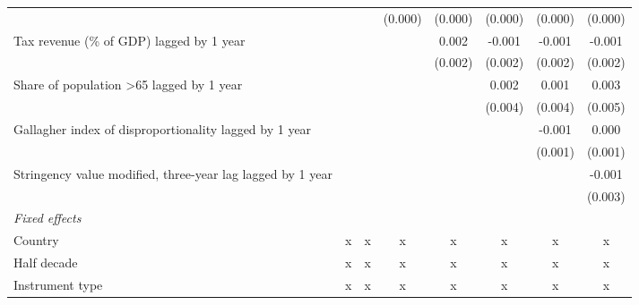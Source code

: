 \begin{tabular}{lccccccc}
                                                                                &                &                & (0.000)        & (0.000)        & (0.000) & (0.000) & (0.000)\\   
   Tax revenue (\% of GDP) lagged by 1 year                                     &                &                &                & 0.002          & -0.001  & -0.001  & -0.001\\   
                                                                                &                &                &                & (0.002)        & (0.002) & (0.002) & (0.002)\\   
   Share of population >65 lagged by 1 year                                     &                &                &                &                & 0.002   & 0.001   & 0.003\\   
                                                                                &                &                &                &                & (0.004) & (0.004) & (0.005)\\   
   Gallagher index of disproportionality lagged by 1 year                       &                &                &                &                &         & -0.001  & 0.000\\   
                                                                                &                &                &                &                &         & (0.001) & (0.001)\\   
   Stringency value modified, three-year lag lagged by 1 year                   &                &                &                &                &         &         & -0.001\\   
                                                                                &                &                &                &                &         &         & (0.003)\\   
   \emph{Fixed effects}\\
   Country                                                                      & x              & x              & x              & x              & x       & x       & x\\  
   Half decade                                                                  & x              & x              & x              & x              & x       & x       & x\\  
   Instrument type                                                              & x              & x              & x              & x              & x       & x       & x\\  

\end{tabular}
